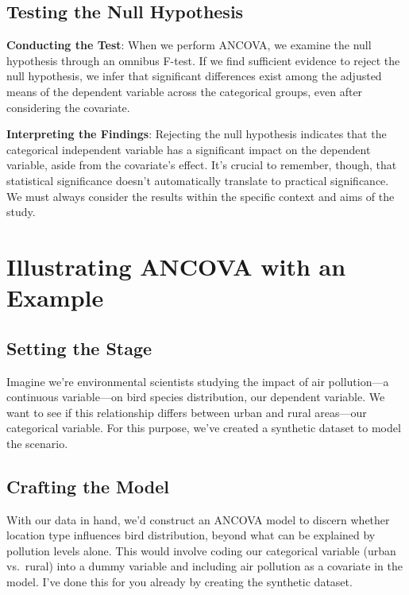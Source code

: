 \documentclass[
  letterpaper,
  DIV=11,
  numbers=noendperiod]{scrreprt}
\begin{document}
\subsection{Testing the Null
Hypothesis}\label{testing-the-null-hypothesis}

\textbf{Conducting the Test}: When we perform ANCOVA, we examine the
null hypothesis through an omnibus F-test. If we find sufficient
evidence to reject the null hypothesis, we infer that significant
differences exist among the adjusted means of the dependent variable
across the categorical groups, even after considering the covariate.

\textbf{Interpreting the Findings}: Rejecting the null hypothesis
indicates that the categorical independent variable has a significant
impact on the dependent variable, aside from the covariate's effect.
It's crucial to remember, though, that statistical significance doesn't
automatically translate to practical significance. We must always
consider the results within the specific context and aims of the study.

\section{Illustrating ANCOVA with an
Example}\label{illustrating-ancova-with-an-example}

\subsection{Setting the Stage}\label{setting-the-stage}

Imagine we're environmental scientists studying the impact of air
pollution---a continuous variable---on bird species distribution, our
dependent variable. We want to see if this relationship differs between
urban and rural areas---our categorical variable. For this purpose,
we've created a synthetic dataset to model the scenario.

\subsection{Crafting the Model}\label{crafting-the-model}

With our data in hand, we'd construct an ANCOVA model to discern whether
location type influences bird distribution, beyond what can be explained
by pollution levels alone. This would involve coding our categorical
variable (urban vs.~rural) into a dummy variable and including air
pollution as a covariate in the model. I've done this for you already by
creating the synthetic dataset.
\end{document}
